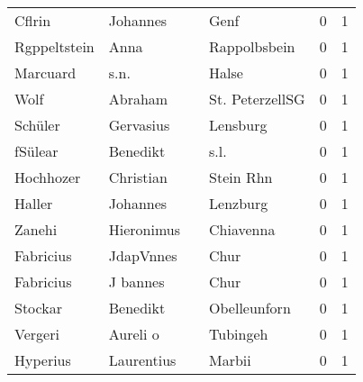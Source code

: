 \documentclass[10pt,a4paper,landscape]{article}
\begin{document}
\begin{longtable}{llllrr}
                   Cflrin &                           Johannes &             &                                        Genf &          0 &         1 \\
             Rgppeltstein &                               Anna &             &                                Rappolbsbein &          0 &         1 \\
                 Marcuard &                               s.n. &             &                                       Halse &          0 &         1 \\
                     Wolf &                            Abraham &             &                             St. PeterzellSG &          0 &         1 \\
                  Schüler &                          Gervasius &             &                                    Lensburg &          0 &         1 \\
                  fSülear &                           Benedikt &             &                                        s.l. &          0 &         1 \\
                Hochhozer &                          Christian &             &                                   Stein Rhn &          0 &         1 \\
                   Haller &                           Johannes &             &                                    Lenzburg &          0 &         1 \\
                   Zanehi &                         Hieronimus &             &                                   Chiavenna &          0 &         1 \\
                Fabricius &                          JdapVnnes &             &                                        Chur &          0 &         1 \\
                Fabricius &                           J bannes &             &                                        Chur &          0 &         1 \\
                  Stockar &                           Benedikt &             &                                Obelleunforn &          0 &         1 \\
                  Vergeri &                           Aureli o &             &                                    Tubingeh &          0 &         1 \\
                 Hyperius &                         Laurentius &             &                                      Marbii &          0 &         1 \\

\end{longtable}
\end{document}
